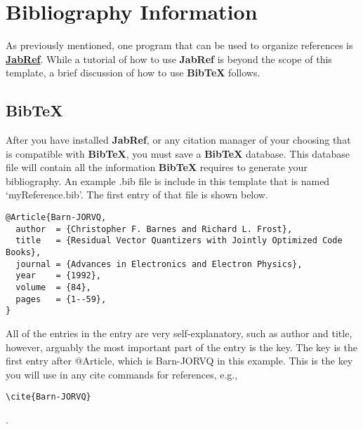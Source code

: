 %
%
%
%


\chapter{Bibliography Information}\label{appendix:02}

As previously mentioned, one program that can be used to organize references is \href{http://www.jabref.org}{\textbf{JabRef}}. While a tutorial of how to use \textbf{JabRef} is beyond the scope of this template, a brief discussion of how to use \textbf{BibTeX} follows.

\section{BibTeX}
After you have installed \textbf{JabRef}, or any citation manager of your choosing that is compatible with \textbf{BibTeX}, you must save a \textbf{BibTeX} database. This database file will contain all the information \textbf{BibTeX} requires to generate your bibliography. An example .bib file is include in this template that is named `myReference.bib'. The first entry of that file is shown below.

{\footnotesize \begin{verbatim}
@Article{Barn-JORVQ,
  author  = {Christopher F. Barnes and Richard L. Frost},
  title   = {Residual Vector Quantizers with Jointly Optimized Code Books},
  journal = {Advances in Electronics and Electron Physics},
  year    = {1992},
  volume  = {84},
  pages   = {1--59},
}
\end{verbatim}}

All of the entries in the entry are very self-explanatory, such as author and title, however, arguably the most important part of the entry is the key. The key is the first entry after @Article, which is Barn-JORVQ in this example. This is the key you will use in any cite commands for references, e.g.,

{\footnotesize\begin{verbatim}\cite{Barn-JORVQ}\end{verbatim}}.


